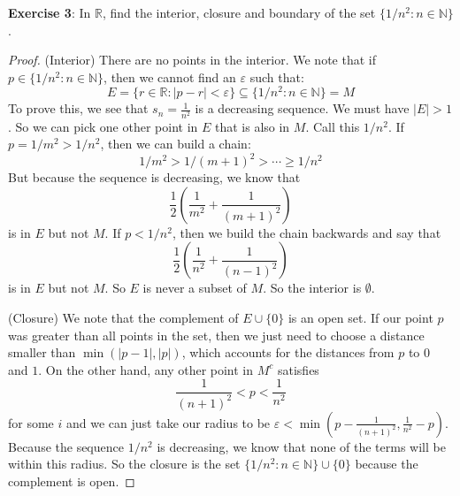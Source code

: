 \documentclass{article}
\begin{document}
\textbf{Exercise 3}: In $\mathbb{R}$, find the interior, closure and boundary of the set $\{1/n^{2} : n \in \mathbb{N}\}$.
    \begin{proof}
        (Interior) There are no points in the interior. We note that if $p \in \{1/n^{2} : n \in \mathbb{N}\}$, then we cannot find an $\varepsilon$ such that:
            \begin{equation*}
                E = \{r \in \mathbb{R} : \lvert p - r \rvert <  \varepsilon\} \subseteq \{1/n^{2} : n \in \mathbb{N}\} = M
            \end{equation*}
        To prove this, we see that $s_{n} = \frac{1}{n^{2}}$ is a decreasing sequence. We must have $\lvert E \rvert > 1$. So we can pick one other point in $E$ that is also in $M$. Call this $1/n^{2}$. If $p = 1/m^{2} >  1/n^{2}$, then we can build a chain:
            \begin{equation*}
                1/m^{2} > 1/(m + 1)^{2} > \cdots \geq  1/n^{2} 
            \end{equation*}
        But because the sequence is decreasing, we know that 
            \begin{equation*}
                \dfrac{1}{2}\left(\dfrac{1}{m^{2}} + \dfrac{1}{(m + 1)^{2}}\right)
            \end{equation*}
        is in $E$ but not $M$. If $p < 1/n^{2}$, then we build the chain backwards and say that 
            \begin{equation*}
                \dfrac{1}{2}\left(\dfrac{1}{n^{2}} + \dfrac{1}{(n - 1)^{2}}\right)
            \end{equation*}
        is in $E$ but not $M$. So $E$ is never a subset of $M$. So the interior is $\emptyset$.

        (Closure) We note that the complement  of $E \cup \{0\}$ is an open set. If our point $p$ was greater than all points in the set, then we just need to choose a distance smaller than $\min(\lvert p - 1 \rvert, \lvert p \rvert)$, which accounts for the distances from $p$ to $0$ and $1$. On the other hand, any other point in $M^{c}$ satisfies 
            \begin{equation*}
                \dfrac{1}{(n + 1)^{2}} < p < \dfrac{1}{n^{2}}
            \end{equation*}
        for some $i$ and we can just take our radius to be $\varepsilon < \min(p - \frac{1}{(n + 1)^{2}}, \frac{1}{n^{2}} - p)$. Because the sequence $1/n^{2}$ is decreasing, we know that none of the terms will be within this radius. So the closure is the set $\{1/n^{2} : n \in \mathbb{N}\} \cup \{0\}$ because the complement is open.


\end{proof}
\end{document}
